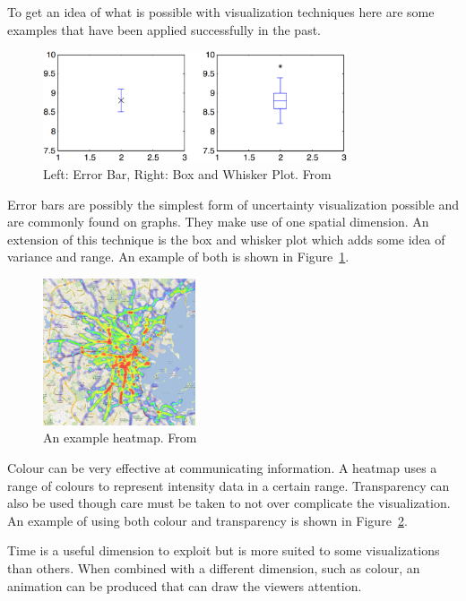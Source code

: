 To get an idea of what is possible with visualization techniques here are some examples that have been applied successfully in the past.

\begin{figure}[h]
    \centering
	\includegraphics[width=0.8\textwidth]{images/background/error_bars.png}
    \caption{Left: Error Bar, Right: Box and Whisker Plot. From \cite{uncertaintyoverview}}
    \label{fig:error_bars}
\end{figure}

Error bars are possibly the simplest form of uncertainty visualization possible and are commonly found on graphs. They make use of one spatial dimension. An extension of this technique is the box and whisker plot which adds some idea of variance and range. An example of both is shown in Figure~\ref{fig:error_bars}.

\begin{figure}[h]
    \centering
	\includegraphics[width=0.4\textwidth]{images/background/heatmap.png}
    \caption{An example heatmap. From \cite{heatmap}}
    \label{fig:heatmap}
\end{figure}

Colour can be very effective at communicating information. A heatmap uses a range of colours to represent intensity data in a certain range. Transparency can also be used though care must be taken to not over complicate the visualization. An example of using both colour and transparency is shown in Figure~\ref{fig:heatmap}.

Time is a useful dimension to exploit but is more suited to some visualizations than others. When combined with a different dimension, such as colour, an animation can be produced that can draw the viewers attention.

